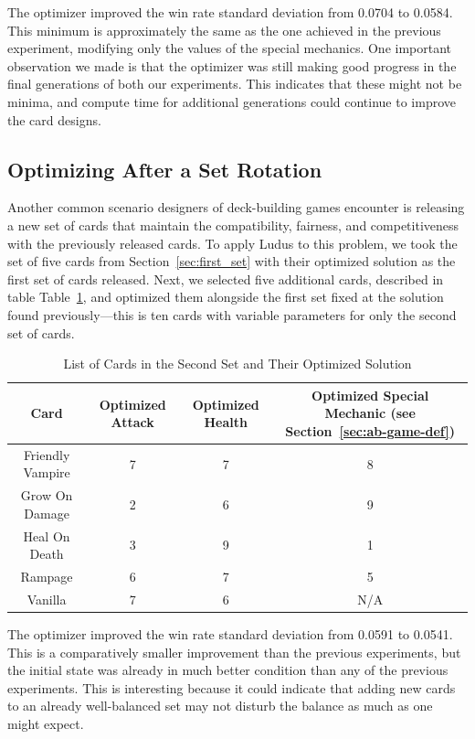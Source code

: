 The optimizer improved the win rate standard deviation from 0.0704 to 0.0584. This minimum is approximately the same as the one achieved in the previous experiment, modifying only the values of the special mechanics. One important observation we made is that the optimizer was still making good progress in the final generations of both our experiments. This indicates that these might not be minima, %
and compute time for additional generations could continue to improve the card designs.

\subsection{Optimizing After a Set Rotation}

Another common scenario designers of deck-building games encounter is releasing a new set %
of cards that maintain the compatibility, fairness, and competitiveness with the previously released cards. %
To apply {\sc Ludus} to this problem, we took the set of five cards from Section~\ref{sec:first_set} with their optimized solution as %
the first set of cards released. Next, we selected five additional cards, described in table Table~\ref{tab:second_set}, and optimized them alongside %
the first set fixed at the solution found previously---this is ten cards with variable parameters for only the second set of cards. 


\begin{table}[t]
\centering
\caption{List of Cards in the Second Set and Their Optimized Solution}
\label{tab:second_set}
\begin{tabular}{||c c c c||} 
 \hline
 Card & Optimized Attack & Optimized Health & Optimized Special Mechanic (see Section~\ref{sec:ab-game-def})\\ [0.5ex]
 \hline\hline
 Friendly Vampire & 7 & 7 & 8 \\
 \hline
 Grow On Damage & 2 & 6 & 9 \\
 \hline
 Heal On Death & 3 & 9 & 1 \\
 \hline
 Rampage & 6 & 7 & 5 \\ 
 \hline
 Vanilla & 7 & 6 & N/A \\
 \hline
\end{tabular}
\end{table}

The optimizer improved the win rate standard deviation from 0.0591 to 0.0541. This is a comparatively smaller improvement than the previous experiments, %
but the initial state was already in much better condition than any of the previous experiments. This is interesting because it could indicate that adding new cards to an already well-balanced set may not disturb the balance as much as one might expect. 


